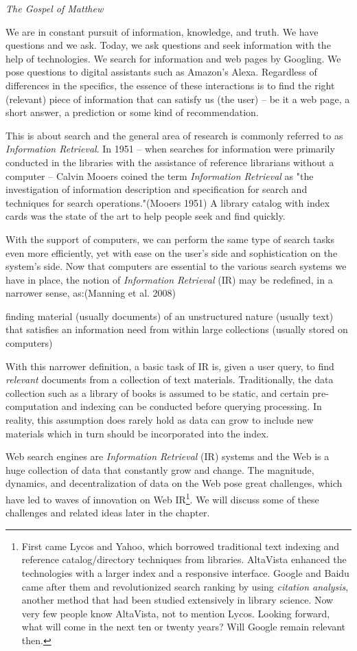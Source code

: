 \documentclass[
  letterpaper,
]{scrbook}
\begin{document}
\emph{The Gospel of Matthew}

We are in constant pursuit of information, knowledge, and truth. We have
questions and we ask. Today, we ask questions and seek information with
the help of technologies. We search for information and web pages by
Googling. We pose questions to digital assistants such as Amazon's
Alexa. Regardless of differences in the specifics, the essence of these
interactions is to find the right (relevant) piece of information that
can satisfy us (the user) -- be it a web page, a short answer, a
prediction or some kind of recommendation.

This is about search and the general area of research is commonly
referred to as \emph{Information Retrieval}. In 1951 -- when searches
for information were primarily conducted in the libraries with the
assistance of reference librarians without a computer -- Calvin Mooers
coined the term \emph{Information Retrieval} as "the investigation of
information description and specification for search and techniques for
search operations."(Mooers 1951) A library catalog with index cards was
the state of the art to help people seek and find quickly.

With the support of computers, we can perform the same type of search
tasks even more efficiently, yet with ease on the user's side and
sophistication on the system's side. Now that computers are essential to
the various search systems we have in place, the notion of
\emph{Information Retrieval} (IR) may be redefined, in a narrower sense,
as:(Manning et al. 2008)

finding material (usually documents) of an unstructured nature (usually
text) that satisfies an information need from within large collections
(usually stored on computers)

With this narrower definition, a basic task of IR is, given a user
query, to find \emph{relevant} documents from a collection of text
materials. Traditionally, the data collection such as a library of books
is assumed to be static, and certain pre-computation and indexing can be
conducted before querying processing. In reality, this assumption does
rarely hold as data can grow to include new materials which in turn
should be incorporated into the index.

Web search engines are \emph{Information Retrieval} (IR) systems and the
Web is a huge collection of data that constantly grow and change. The
magnitude, dynamics, and decentralization of data on the Web pose great
challenges, which have led to waves of innovation on Web IR\footnote{First
  came Lycos and Yahoo, which borrowed traditional text indexing and
  reference catalog/directory techniques from libraries. AltaVista
  enhanced the technologies with a larger index and a responsive
  interface. Google and Baidu came after them and revolutionized search
  ranking by using \emph{citation analysis}, another method that had
  been studied extensively in library science. Now very few people know
  AltaVista, not to mention Lycos. Looking forward, what will come in
  the next ten or twenty years? Will Google remain relevant then.}. We
will discuss some of these challenges and related ideas later in the
chapter.
\end{document}
